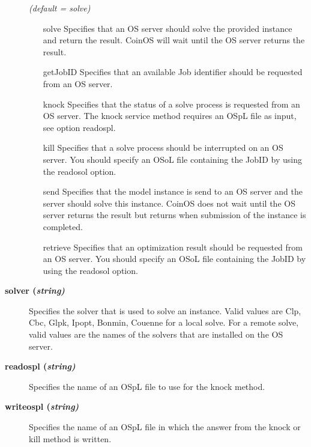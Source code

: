 \begin{description}
\textsl{(default = solve)}
\begin{itemize}
\item[solve] 
Specifies that an OS server should solve the provided instance and return the result.
CoinOS will wait until the OS server returns the result.
\item[getJobID] 
Specifies that an available Job identifier should be requested from an OS server.
\item[knock] 
Specifies that the status of a solve process is requested from an OS server.
The knock service method requires an OSpL file as input, see option readospl.
\item[kill] 
Specifies that a solve process should be interrupted on an OS server.
You should specify an OSoL file containing the JobID by using the readosol option.
\item[send] 
Specifies that the model instance is send to an OS server and the server should solve this instance.
CoinOS does not wait until the OS server returns the result but returns when submission of the instance is completed.
\item[retrieve] 
Specifies that an optimization result should be requested from an OS server.
You should specify an OSoL file containing the JobID by using the readosol option.
\end{itemize}

\item[\label{solver}\hypertarget{solver}
{\textbf{solver (\slshape{string})}}]\hspace{1.0in}

Specifies the solver that is used to solve an instance.
Valid values are Clp, Cbc, Glpk, Ipopt, Bonmin, Couenne for a local solve.
For a remote solve, valid values are the names of the solvers that are installed on the OS server.


\item[\label{readospl}\hypertarget{readospl}
{\textbf{readospl (\slshape{string})}}]\hspace{1.0in}

Specifies the name of an OSpL file to use for the knock method.


\item[\label{writeospl}\hypertarget{writeospl}
{\textbf{writeospl (\slshape{string})}}]\hspace{1.0in}

Specifies the name of an OSpL file in which the answer from the knock or kill method is written.

\end{description}
